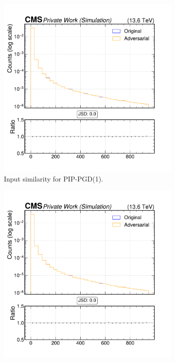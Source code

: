 \begin{figure}[htbp]
  \centering
  \begin{subfigure}[t]{0.32\textwidth}
    \includegraphics[width=\linewidth]{media/output/features/compare/combined_it_1/cmp_cpf_arr_Cpfcan_BtagPf_trackSip3dSig.pdf}
    \caption*{Input similarity for PIP-PGD(1).}
  \end{subfigure}\hfill
  \begin{subfigure}[t]{0.32\textwidth}
    \includegraphics[width=\linewidth]{media/output/features/compare/combined_it_2/cmp_cpf_arr_Cpfcan_BtagPf_trackSip3dSig.pdf}

\end{subfigure}
\end{figure}
